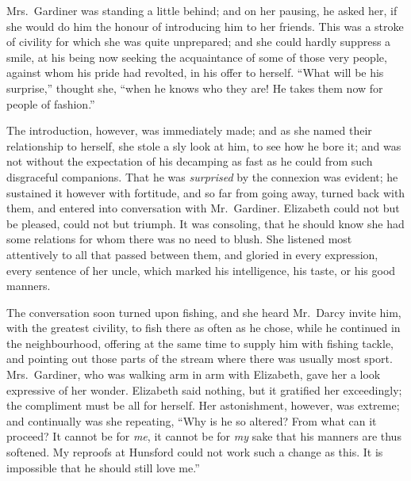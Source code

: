 Mrs.\ Gardiner was standing a little behind; and on
her pausing, he asked her, if she would do him the honour
of introducing him to her friends. This was a stroke of
civility for which she was quite unprepared; and she
could hardly suppress a smile, at his being now seeking
the acquaintance of some of those very people, against
whom his pride had revolted, in his offer to herself. “What
will be his surprise,” thought she, “when he knows who
they are! He takes them now for people of fashion.”

The introduction, however, was immediately made;
and as she named their relationship to herself, she stole
a sly look at him, to see how he bore it; and was not
without the expectation of his decamping as fast as he
could from such disgraceful companions. That he was
\textit{surprised} by the connexion was evident; he sustained it
however with fortitude, and so far from going away,
turned back with them, and entered into conversation
with Mr.\ Gardiner. Elizabeth could not but be pleased,
could not but triumph. It was consoling, that he should
know she had some relations for whom there was no need
to blush. She listened most attentively to all that passed
between them, and gloried in every expression, every
sentence of her uncle, which marked his intelligence, his
taste, or his good manners.

The conversation soon turned upon fishing, and she
heard Mr.\ Darcy invite him, with the greatest civility, to
fish there as often as he chose, while he continued in the
neighbourhood, offering at the same time to supply him
with fishing tackle, and pointing out those parts of the
stream where there was usually most sport. Mrs.\ Gardiner,
who was walking arm in arm with Elizabeth, gave her
a look expressive of her wonder. Elizabeth said nothing,
but it gratified her exceedingly; the compliment must
be all for herself. Her astonishment, however, was
extreme; and continually was she repeating, “Why is
he so altered? From what can it proceed? It cannot
be for \textit{me}, it cannot be for \textit{my} sake that his manners are
thus softened. My reproofs at Hunsford could not work
such a change as this. It is impossible that he should
still love me.”

